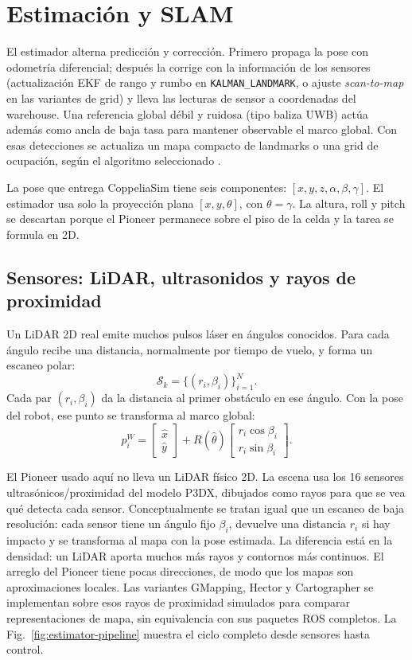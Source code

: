 \chapter{Estimación y SLAM}

El estimador alterna predicción y corrección. Primero propaga
la pose con odometría diferencial; después la corrige con la información de los
sensores (actualización EKF de rango y rumbo en \texttt{KALMAN\_LANDMARK}, o
ajuste \textit{scan-to-map} en las variantes de grid) y lleva las lecturas de
sensor a coordenadas del warehouse. Una referencia global débil y ruidosa (tipo
baliza UWB) actúa además como ancla de baja tasa para mantener observable el
marco global. Con esas detecciones se actualiza un
mapa compacto de landmarks o una grid de ocupación, según el algoritmo
seleccionado \cite{thrun2005}.

La pose que entrega CoppeliaSim tiene seis componentes:
\([x,y,z,\alpha,\beta,\gamma]\). El estimador usa solo la proyección plana
\([x,y,\theta]\), con \(\theta=\gamma\). La altura, roll y pitch se descartan
porque el Pioneer permanece sobre el piso de la celda y la tarea se formula en
2D.

\section{Sensores: LiDAR, ultrasonidos y rayos de proximidad}

Un LiDAR 2D real emite muchos pulsos láser en ángulos conocidos. Para cada ángulo
recibe una distancia, normalmente por tiempo de vuelo, y forma un escaneo polar:
\[
\mathcal{S}_k=\{(r_i,\beta_i)\}_{i=1}^{N}.
\]
Cada par \((r_i,\beta_i)\) da la distancia al primer obstáculo en ese ángulo.
Con la pose del robot, ese punto se transforma al marco global:
\[
p_i^W =
\begin{bmatrix}\hat{x}\\\hat{y}\end{bmatrix}+
R(\hat{\theta})
\begin{bmatrix}
r_i\cos\beta_i\\
r_i\sin\beta_i
\end{bmatrix}.
\]

El Pioneer usado aquí no lleva un LiDAR físico 2D. La escena usa los 16 sensores
ultrasónicos/proximidad del modelo P3DX, dibujados como rayos para que se vea
qué detecta cada sensor. Conceptualmente se tratan igual que un escaneo de baja
resolución: cada sensor tiene un ángulo fijo \(\beta_i\), devuelve una distancia
\(r_i\) si hay impacto y se transforma al mapa con la pose estimada. La
diferencia está en la densidad: un LiDAR aporta muchos más rayos y contornos
más continuos. El arreglo del Pioneer tiene pocas direcciones, de modo que los
mapas son aproximaciones locales. Las variantes GMapping, Hector y Cartographer
se implementan sobre esos rayos de proximidad simulados para comparar
representaciones de mapa, sin equivalencia con sus paquetes ROS completos.
La Fig.~\ref{fig:estimator-pipeline} muestra el ciclo completo desde sensores hasta control.

